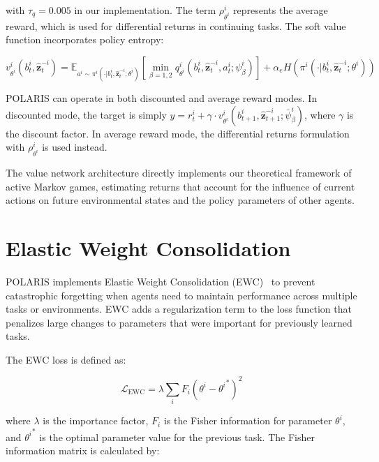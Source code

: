 \documentclass[a4paper,12pt]{report}
\begin{document}
with $\tau_{q} = 0.005$ in our implementation. The term $\rho^{i}_{\theta^i}$ represents the average reward, which is used for differential returns in continuing tasks. The soft value function incorporates policy entropy:

\begin{equation}
    v^{i}_{\theta^i}(b^{i}_{t}, \hat{\boldsymbol{z}}^{-i}_{t}) = \mathbb{E}_{a^i \sim \pi^i(\cdot|b^i_t,\hat{\boldsymbol{z}}^{-i}_t;\theta^i)}[\min_{\beta=1,2}q^{i}_{\theta^i}(b^{i}_{t}, \hat{\boldsymbol{z}}^{-i}_{t}, a^{i}_{t}; \psi^{i}_{\beta})] + \alpha_e H(\pi^{i}(\cdot|b^{i}_{t}, \hat{\boldsymbol{z}}^{-i}_{t}; \theta^{i}))
\end{equation}

POLARIS can operate in both discounted and average reward modes. In discounted mode, the target is simply $y = r^{i}_{t} + \gamma \cdot v^{i}_{\theta^i}(b^{i}_{t+1}, \hat{\boldsymbol{z}}^{-i}_{t+1}; \bar{\psi}^{i}_{\beta})$, where $\gamma$ is the discount factor. In average reward mode, the differential returns formulation with $\rho^{i}_{\theta^i}$ is used instead.

The value network architecture directly implements our theoretical framework of active Markov games, estimating returns that account for the influence of current actions on future environmental states and the policy parameters of other agents.

\section{Elastic Weight Consolidation}

POLARIS implements Elastic Weight Consolidation (EWC)~\cite{kirkpatrick2017overcoming} to prevent catastrophic forgetting when agents need to maintain performance across multiple tasks or environments. EWC adds a regularization term to the loss function that penalizes large changes to parameters that were important for previously learned tasks.

The EWC loss is defined as:

\begin{equation}
    \mathcal{L}_{\text{EWC}} = \lambda \sum_{i} F_i (\theta^i - {\theta^i}^*)^2
\end{equation}

where $\lambda$ is the importance factor, $F_i$ is the Fisher information for parameter $\theta^i$, and ${\theta^i}^*$ is the optimal parameter value for the previous task. The Fisher information matrix is calculated by:
\end{document}

